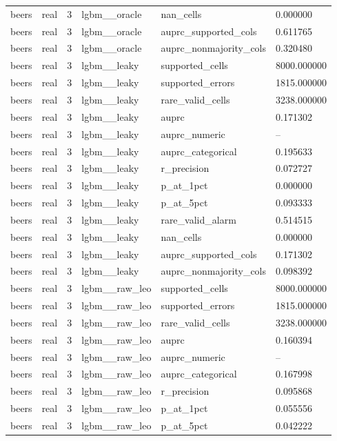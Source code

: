 \begin{tabular}{llllll}
beers & real & 3 & lgbm\_\_oracle & nan\_cells & 0.000000 \\
beers & real & 3 & lgbm\_\_oracle & auprc\_supported\_cols & 0.611765 \\
beers & real & 3 & lgbm\_\_oracle & auprc\_nonmajority\_cols & 0.320480 \\
beers & real & 3 & lgbm\_\_leaky & supported\_cells & 8000.000000 \\
beers & real & 3 & lgbm\_\_leaky & supported\_errors & 1815.000000 \\
beers & real & 3 & lgbm\_\_leaky & rare\_valid\_cells & 3238.000000 \\
beers & real & 3 & lgbm\_\_leaky & auprc & 0.171302 \\
beers & real & 3 & lgbm\_\_leaky & auprc\_numeric & -- \\
beers & real & 3 & lgbm\_\_leaky & auprc\_categorical & 0.195633 \\
beers & real & 3 & lgbm\_\_leaky & r\_precision & 0.072727 \\
beers & real & 3 & lgbm\_\_leaky & p\_at\_1pct & 0.000000 \\
beers & real & 3 & lgbm\_\_leaky & p\_at\_5pct & 0.093333 \\
beers & real & 3 & lgbm\_\_leaky & rare\_valid\_alarm & 0.514515 \\
beers & real & 3 & lgbm\_\_leaky & nan\_cells & 0.000000 \\
beers & real & 3 & lgbm\_\_leaky & auprc\_supported\_cols & 0.171302 \\
beers & real & 3 & lgbm\_\_leaky & auprc\_nonmajority\_cols & 0.098392 \\
beers & real & 3 & lgbm\_\_raw\_leo & supported\_cells & 8000.000000 \\
beers & real & 3 & lgbm\_\_raw\_leo & supported\_errors & 1815.000000 \\
beers & real & 3 & lgbm\_\_raw\_leo & rare\_valid\_cells & 3238.000000 \\
beers & real & 3 & lgbm\_\_raw\_leo & auprc & 0.160394 \\
beers & real & 3 & lgbm\_\_raw\_leo & auprc\_numeric & -- \\
beers & real & 3 & lgbm\_\_raw\_leo & auprc\_categorical & 0.167998 \\
beers & real & 3 & lgbm\_\_raw\_leo & r\_precision & 0.095868 \\
beers & real & 3 & lgbm\_\_raw\_leo & p\_at\_1pct & 0.055556 \\
beers & real & 3 & lgbm\_\_raw\_leo & p\_at\_5pct & 0.042222 \\

\end{tabular}
